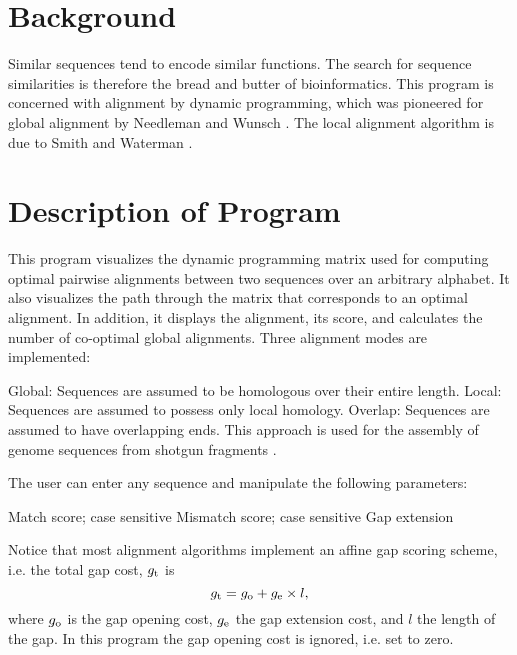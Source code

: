 \section{Background}
Similar sequences tend to encode similar functions. The search for
sequence similarities is therefore the bread and butter of
bioinformatics. This program is concerned with alignment by 
dynamic programming, which was pioneered
for global alignment by Needleman and Wunsch \cite{nee70:gen}. The local
alignment algorithm is due to Smith and Waterman
\cite{smi81:ide}.

\section{Description of Program}
This program visualizes the dynamic programming matrix used for
computing optimal pairwise alignments between two sequences over an
arbitrary alphabet. It also visualizes the path through the matrix
that corresponds to an optimal alignment. In addition, it displays the
alignment, its score, and calculates
the number of co-optimal global alignments. Three alignment modes are
implemented:
\begin{enumerate}
  \I Global: Sequences are assumed to be homologous over their entire
  length.
  \I Local: Sequences are assumed to possess only local homology.
  \I Overlap: Sequences are assumed to have overlapping ends. This
  approach is used for the assembly of genome sequences from
  shotgun fragments \cite{gus97:alg}.
\end{enumerate}

The user can enter any sequence and manipulate the following
parameters:
\begin{enumerate}
  \I Match score; case sensitive
  \I Mismatch score; case sensitive
  \I Gap extension
\end{enumerate}

Notice that most alignment algorithms implement an affine gap scoring
scheme, i.e. the total gap cost, $g_{\rm t}$ is
\[
g_{\rm t} = g_{\rm o} + g_{\rm e}\times l,
\]
where $g_{\rm o}$ is the gap opening cost, $g_{\rm e}$ the gap
extension cost, and $l$ the length of the gap. In this program the gap
opening cost is ignored, i.e. set to zero.

